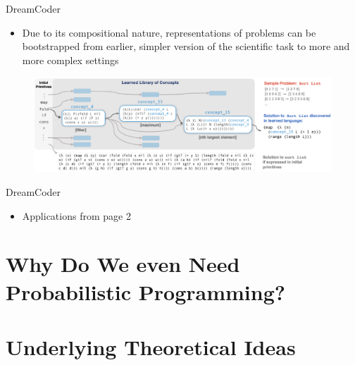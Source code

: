 \documentclass[AERbeamer%
              ,optEnglish%
              ,optBiber%
              ,optBibstyleAlphabetic%
              ,optBeamerClassicFormat%
              ]{AERlatex}%
\begin{document}


\begin{frame}[c]{DreamCoder}
    \centering
    \begin{itemize}
        \item Due to its compositional nature, representations of problems can be bootstrapped from earlier, simpler version of
              the scientific task to more and more complex settings
    \end{itemize}
    \vspace{1cm}
    \begin{figure}
        \centering
        \includegraphics[width=\textwidth]{DreamCoderCompositionality.png}
    \end{figure}
\end{frame} 








\begin{frame}[c]{DreamCoder}
    \centering
    \begin{itemize}
        \item Applications from page 2
    \end{itemize}
\end{frame}




\section{Why Do We even Need Probabilistic Programming?}





\section{Underlying Theoretical Ideas}
\end{document}
